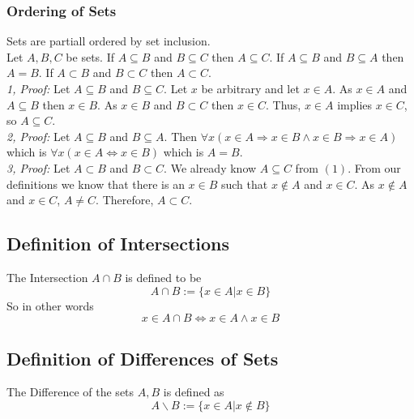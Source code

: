 \subsubsection{Ordering of Sets}
Sets are partiall ordered by set inclusion.\\
Let $A,B,C$ be sets. If $A\subseteq B$ and $B\subseteq C$ then $A\subseteq C$. If $A\subseteq B$ and $B\subseteq A$ then $A=B$. If $A\subset B$ and $B\subset C$ then $A\subset C$.\\
\textit{1, Proof:} Let $A\subseteq B$ and $B\subseteq C$. Let $x$ be arbitrary and let $x\in A$. As $x\in A$ and $A\subseteq B$ then $x\in B$. As $x\in B$ and $B\subset C$ then $x\in C$. Thus, $x\in A$ implies $x\in C$, so $A\subseteq C$.\\
\textit{2, Proof:} Let $A\subseteq B$ and $B\subseteq A$. Then $\forall x (x\in A \Rightarrow x\in B \wedge x\in B \Rightarrow x\in A)$ which is $\forall x (x\in A \Leftrightarrow x\in B)$ which is $A = B$.\\
\textit{3, Proof:} Let $A\subset B$ and $B\subset C$. We already know $A\subseteq C$ from $(1)$. From our definitions we know that there is an $x\in B$ such that $x\notin A$ and $x\in C$. As $x\notin A$ and $x\in C$, $A \neq C$. Therefore, $A\subset C$.

\subsection{Definition of Intersections}
The Intersection $A\cap B$ is defined to be
\begin{equation}
	A\cap B := \{x\in A | x\in B\}
\end{equation}
So in other words
\begin{equation}
	x\in A\cap B \Leftrightarrow x\in A \wedge x\in B
\end{equation}

\subsection{Definition of Differences of Sets}
The Difference of the sets $A,B$ is defined as
\begin{equation}
	A\backslash B := \{x\in A| x\notin B\}
\end{equation}

